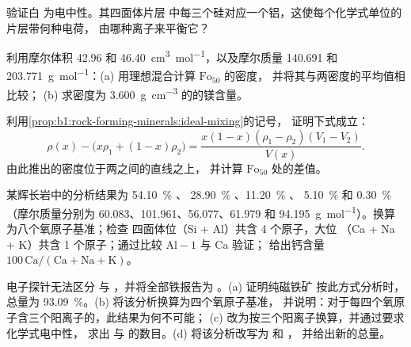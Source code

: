 \begin{exercise}[$\star\star$]\label{exo:b1:rock-forming-minerals:8}
验证白  为电中性。其四面体片层
中每三个硅对应一个铝，这使每个化学式单位的片层带何种电荷，
由哪种离子来平衡它？
\end{exercise}

\begin{exercise}[$\star\star$]\label{exo:b1:rock-forming-minerals:9}
利用摩尔体积 \num{42.96} 和 \qty{46.40}{cm^3.mol^{-1}}，以及摩尔质量
\num{140.691} 和 \qty{203.771}{g.mol^{-1}}：(a) 用理想混合计算 $\text{Fo}_{50}$ 的密度，
并将其与两密度的平均值相比较；
(b) 求密度为
\qty{3.600}{g.cm^{-3}} 的的镁含量。
\end{exercise}

\begin{exercise}[$\star\star\star$]\label{exo:b1:rock-forming-minerals:10}
利用\cref{prop:b1:rock-forming-minerals:ideal-mixing}的记号，
证明下式成立：
\[
  \rho(x) - \bigl(x\rho_1 + (1 - x)\rho_2\bigr) =
  \frac{x(1 - x)(\rho_1 - \rho_2)(V_1 - V_2)}{V(x)} .
\]
由此推出的密度位于两之间的直线之上，
并计算 $\text{Fo}_{50}$ 处的差值。
\end{exercise}

\begin{exercise}[$\star\star\star$]\label{exo:b1:rock-forming-minerals:11}
某辉长岩中的分析结果为 \qty{54.10}{\percent} 、
\qty{28.90}{\percent} 、\qty{11.20}{\percent} 、
\qty{5.10}{\percent}  和 \qty{0.30}{\percent} （摩尔质量分别为
\num{60.083}、\num{101.961}、\num{56.077}、\num{61.979} 和
\qty{94.195}{g.mol^{-1}}）。换算为八个氧原子基准；检查
四面体位（Si + Al）共含 4 个原子，大位
（Ca + Na + K）共含 1 个原子；通过比较 $\mathrm{Al} - 1$ 与 Ca 验证；
给出钙含量 $100\,\mathrm{Ca}/(\mathrm{Ca} +
\mathrm{Na} + \mathrm{K})$。
\end{exercise}

\begin{exercise}[$\star\star\star$]\label{exo:b1:rock-forming-minerals:12}
电子探针无法区分  与 ，并将全部铁报告为
。(a) 证明纯磁铁矿  按此方式分析时，
总量为 \qty{93.09}{\percent}。(b) 将该分析换算为四个氧原子基准，
并说明：对于每四个氧原子含三个阳离子的，此结果为何不可能；
(c) 改为按三个阳离子换算，并通过要求化学式电中性，
求出  与  的数目。(d) 将该分析改写为
 和 ，
并给出新的总量。
\end{exercise}

